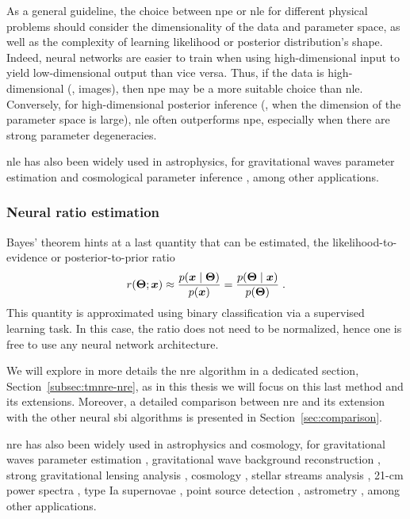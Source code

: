 As a general guideline, the choice between \gls*{npe} or \gls*{nle} for different physical problems should consider the dimensionality of the data and parameter space, as well as the complexity of learning likelihood or posterior distribution's shape. Indeed, neural networks are easier to train when using high-dimensional input to yield low-dimensional output than vice versa. Thus, if the data is high-dimensional (\eg, images), then \gls*{npe} may be a more suitable choice than \gls*{nle}. Conversely, for high-dimensional posterior inference (\ie, when the dimension of the parameter space is large), \gls*{nle} often outperforms \gls*{npe}, especially when there are strong parameter degeneracies. 

\Gls*{nle} has also been widely used in astrophysics, for gravitational waves parameter estimation \cite{Vilchez:2024qnw} and cosmological parameter inference \cite{Alsing:2019xrx, Modi:2023drt, Makinen:2021nly, DES:2024xij, Jeffrey:2020aa}, among other applications.


\subsubsection{Neural ratio estimation}

Bayes' theorem hints at a last quantity that can be estimated, the likelihood-to-evidence or posterior-to-prior ratio 
\begin{equation}
	r(\bm{\Theta};\bm{x})\approx\frac{p(\bm{x}\mid\bm{\Theta})}{p(\bm{x})}=\frac{p(\bm{\Theta}\mid\bm{x})}{p(\bm{\Theta})}\; .
\end{equation}
This quantity is approximated using binary classification via a supervised learning task. In this case, the ratio does not need to be normalized, hence one is free to use any neural network architecture. 

We will explore in more details the \gls*{nre} algorithm in a dedicated section, Section~\ref{subsec:tmnre-nre}, as in this thesis we will focus on this last method and its extensions. Moreover, a detailed comparison between \gls*{nre} and its extension with the other neural \gls*{sbi} algorithms is presented in Section~\ref{sec:comparison}.

\Gls*{nre} has also been widely used in astrophysics and cosmology, for gravitational waves parameter estimation \cite{Bhardwaj:2023xph, Alvey:2023naa}, gravitational wave background reconstruction \cite{Alvey:2023npw}, strong gravitational lensing analysis \cite{Brehmer:2019jyt, Zhang:2022djp, Montel:2022fhv, Coogan:2022cky}, cosmology \cite{Cole:2021gwr, List:2023aa, FrancoAbellan:2024tbj}, stellar streams analysis \cite{Hermans:2020skz, albatross}, 21-cm power spectra \cite{Saxena:2023tue}, type Ia supernovae \cite{Karchev:2022xyn, Karchev:2024stw}, point source detection \cite{AnauMontel:2022ppb}, astrometry \cite{Mishra-Sharma:2021nhh}, among other applications. 


